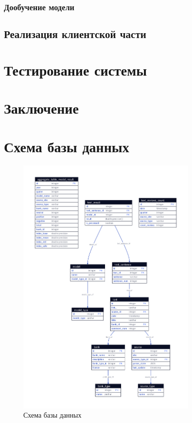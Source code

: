 \documentclass[PI, VKR]{HSEUniversity}
\begin{document}
\subsection{Дообучение модели}
\label{sec:org9832cfc}
\section{Реализация клиентской части}
\label{sec:org7b92f2b}
\chapter{Тестирование системы}
\label{sec:org5c3dd95}
\chapter*{Заключение}
\label{sec:org3da0a93}
\putbibliography
\appendix
\chapter{Схема базы данных}
\label{sec:org4ec4a6e}
\begin{figure}[h!]
\centering
\includegraphics[width=0.8\textwidth]{img/d2/database.png}
\caption{\label{fig:database}Схема базы данных}
\end{figure}
\end{document}
